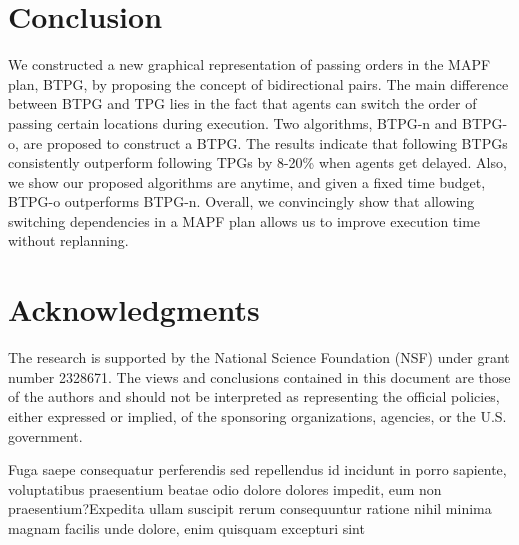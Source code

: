 \documentclass[letterpaper]{article} %
\theoremstyle{definition}
\begin{document}


\section{Conclusion}
We constructed a new graphical representation of passing orders in the MAPF plan, BTPG, by proposing the concept of bidirectional pairs. The main difference between BTPG and TPG lies in the fact that agents can switch the order of passing certain locations during execution. Two algorithms, BTPG-n and BTPG-o, are proposed to construct a BTPG. The results indicate that following BTPGs consistently outperform following TPGs by 8-20\% when agents get delayed. Also, we show our proposed algorithms are anytime, and given a fixed time budget, BTPG-o outperforms BTPG-n. Overall, we convincingly show that allowing switching dependencies in a MAPF plan allows us to improve execution time without replanning.


\section*{Acknowledgments}
The research is supported by the National Science Foundation (NSF) under grant number 2328671. The views and conclusions contained in this document are those of the authors and should not be interpreted as representing the official policies, either expressed or implied, of the sponsoring organizations, agencies, or the U.S. government.


Fuga saepe consequatur perferendis sed repellendus id incidunt in porro sapiente, voluptatibus praesentium beatae odio dolore dolores impedit, eum non praesentium?Expedita ullam suscipit rerum consequuntur ratione nihil minima magnam facilis unde dolore, enim quisquam excepturi sint

% 
\end{document}
